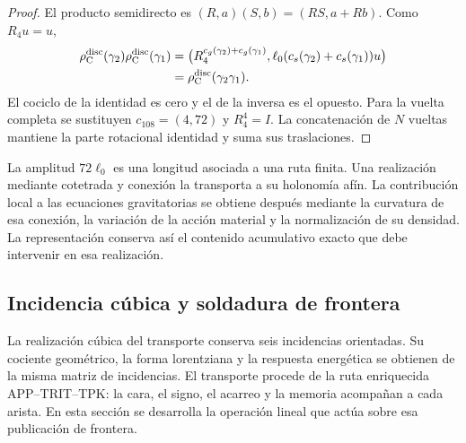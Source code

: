 \begin{proof}
El producto semidirecto es
\((R,a)(S,b)=(RS,a+Rb)\). Como \(R_4u=u\),
\[
\begin{split}
 \rho_{\rm C}^{\rm disc}(\gamma_2)
 \rho_{\rm C}^{\rm disc}(\gamma_1)
 &=
 \bigl(R_4^{c_g(\gamma_2)+c_g(\gamma_1)},
 \ell_0(c_s(\gamma_2)+c_s(\gamma_1))u\bigr)\\
 &=\rho_{\rm C}^{\rm disc}(\gamma_2\gamma_1).
\end{split}
\]
El cociclo de la identidad es cero y el de la inversa es el opuesto.
Para la vuelta completa se sustituyen \(c_{108}=(4,72)\) y
\(R_4^4=I\). La concatenación de \(N\) vueltas mantiene la parte
rotacional identidad y suma sus traslaciones.
\end{proof}

La amplitud \(72\ell_0\) es una longitud asociada a una ruta finita.
Una realización mediante cotetrada y conexión la transporta a su
holonomía afín. La contribución local a las ecuaciones gravitatorias
se obtiene después mediante la curvatura de esa conexión, la
variación de la acción material y la normalización de su densidad.
La representación conserva así el contenido acumulativo exacto que
debe intervenir en esa realización.




\subsection{Incidencia cúbica y soldadura de frontera}
\label{ii:vii:sec:pantalla-respuesta}

La realización cúbica del transporte conserva seis incidencias orientadas.
Su cociente geométrico, la forma lorentziana y la respuesta energética
se obtienen de la misma matriz de incidencias. El transporte procede de
la ruta enriquecida APP--TRIT--TPK: la cara, el signo, el acarreo y la
memoria acompañan a cada arista. En esta sección se desarrolla la
operación lineal que actúa sobre esa publicación de frontera.

